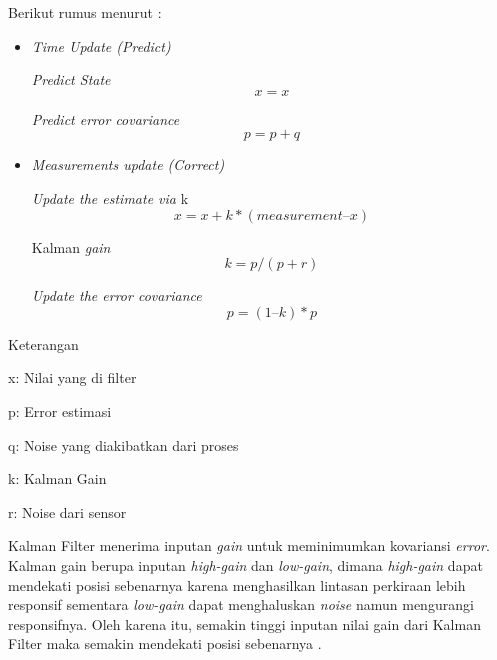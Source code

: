 Berikut rumus menurut \citep{ihsan2018analisis}:
\begin{itemize}
\item \textit{Time Update (Predict)}

\par \textit{Predict State}
\begin{equation}
x = x
\end{equation}

\par \textit{Predict error covariance}
\begin{equation}
p = p + q
\end{equation}

\item \textit{Measurements update (Correct)}
\par \textit{Update the estimate via} k 
\begin{equation}
x = x + k*(measurement – x)
\end{equation}

\par Kalman \textit{gain} 
\begin{equation}
k = p / ( p+r )
\end{equation}

\par \textit{Update the error covariance}
\begin{equation}
p = (1 – k )* p
\end{equation}

\end{itemize}
\par Keterangan
\par x: Nilai yang di filter
\par p: Error estimasi
\par q: Noise yang diakibatkan dari proses
\par k: Kalman Gain
\par r: Noise dari sensor\newline


\par Kalman Filter menerima inputan \textit{gain} untuk meminimumkan kovariansi \textit{error}. Kalman gain berupa inputan \textit{high-gain} dan \textit{low-gain}, dimana \textit{high-gain} dapat mendekati posisi sebenarnya karena menghasilkan lintasan perkiraan lebih responsif sementara \textit{low-gain} dapat menghaluskan \textit{noise} namun mengurangi responsifnya. Oleh karena itu, semakin tinggi inputan nilai gain dari Kalman Filter maka semakin mendekati 
posisi sebenarnya \citep{ihsan2018analisis}.


